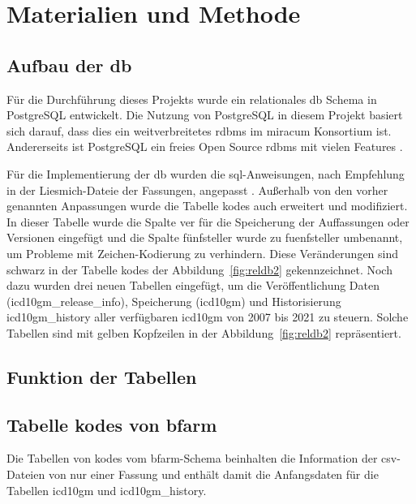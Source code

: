 \chapter{Materialien und Methode} \label{ch:database}

\section{Aufbau der \acs{db}} \label{sec:dbdevelop}

Für die Durchführung dieses Projekts wurde ein relationales \ac{db} Schema in PostgreSQL entwickelt. Die Nutzung von PostgreSQL in diesem Projekt basiert sich darauf, dass dies ein weitverbreitetes \ac{rdbms} im \ac{miracum} Konsortium ist. Andererseits ist PostgreSQL ein freies Open Source \ac{rdbms} mit vielen Features \cite{postgres}.

Für die Implementierung der \ac{db} wurden die \ac{sql}-Anweisungen, nach Empfehlung in der Liesmich-Dateie der Fassungen, angepasst \cite{readmel}. Außerhalb von den vorher genannten Anpassungen wurde die Tabelle \glqq\textsf{kodes}\grqq{} auch erweitert und modifiziert. In dieser Tabelle wurde die Spalte \glqq\textsf{ver}\grqq{} für die Speicherung der Auffassungen oder Versionen eingefügt und die Spalte \textsf{fünfsteller} wurde zu \glqq\textsf{fuenfsteller}\grqq{} umbenannt, um Probleme mit Zeichen-Kodierung zu verhindern. Diese Veränderungen sind schwarz in der Tabelle \glqq\textsf{kodes}\grqq{} der Abbildung~\ref{fig:reldb2} gekennzeichnet. Noch dazu wurden drei neuen Tabellen eingefügt, um die Veröffentlichung Daten (\glqq\textsf{icd10gm\_release\_info}\grqq{}), Speicherung (\glqq\textsf{icd10gm}\grqq{}) und Historisierung \glqq\textsf{icd10gm\_history}\grqq{} aller verfügbaren \ac{icd10gm} von 2007 bis 2021 zu steuern. Solche Tabellen sind mit gelben Kopfzeilen in der Abbildung~\ref{fig:reldb2} repräsentiert.

\section{Funktion der Tabellen} \label{sec:functab}

\section{Tabelle \glqq\textsf{kodes}\grqq{} von \acs{bfarm}} \label{subsec:bfarmtables}

Die Tabellen von \glqq\textsf{kodes}\grqq{} vom \ac{bfarm}-Schema beinhalten die Information der \ac{csv}-Dateien von nur einer Fassung und enthält damit die Anfangsdaten für die Tabellen \glqq\textsf{icd10gm}\grqq{} und \glqq\textsf{icd10gm\_history}\grqq{}.

